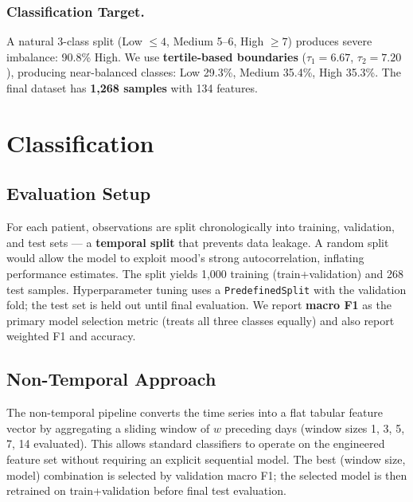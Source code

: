 \documentclass[runningheads]{llncs}
\begin{document}
\subsubsection{Classification Target.}

A natural 3-class split (Low $\leq 4$, Medium 5--6, High $\geq 7$) produces severe imbalance: 90.8\% High. We use \textbf{tertile-based boundaries} ($\tau_1 = 6.67$, $\tau_2 = 7.20$), producing near-balanced classes: Low 29.3\%, Medium 35.4\%, High 35.3\%. The final dataset has \textbf{1,268 samples} with 134 features.

\section{Classification}

\subsection{Evaluation Setup}

For each patient, observations are split chronologically into training, validation, and test sets --- a \textbf{temporal split} that prevents data leakage. A random split would allow the model to exploit mood's strong autocorrelation, inflating performance estimates. The split yields 1,000 training (train+validation) and 268 test samples. Hyperparameter tuning uses a \texttt{PredefinedSplit} with the validation fold; the test set is held out until final evaluation. We report \textbf{macro F1} as the primary model selection metric (treats all three classes equally) and also report weighted F1 and accuracy.

\subsection{Non-Temporal Approach}

The non-temporal pipeline converts the time series into a flat tabular feature vector by aggregating a sliding window of $w$ preceding days (window sizes 1, 3, 5, 7, 14 evaluated). This allows standard classifiers to operate on the engineered feature set without requiring an explicit sequential model. The best (window size, model) combination is selected by validation macro F1; the selected model is then retrained on train+validation before final test evaluation.
\end{document}
